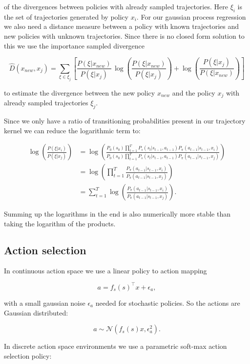 of the divergences between policies with already sampled trajectories. Here $\xi_i$ is the set of trajectories generated by policy $x_i$. For our gaussian process regression we also need a distance measure between a policy with known trajectories and new policies with unknown trajectories. Since there is no closed form solution to this we use the importance sampled divergence

$$\hat{D}(x_{ new }, x_{ j }) = \sum _{\xi \in \xi_j} \left[\frac{P(\xi|x_{ new })}{P(\xi|x_{ j })}\,\log\left(\frac{P(\xi|x_{new})}{P(\xi|x_{j})}\right)+\log\left(\frac{P(\xi|x_{ j })}{P(\xi|x_{ new })}\right)\right] $$

to estimate the divergence between the new policy $x_{new}$ and the policy $x_j$ with already sampled trajectories $\xi_j$.

Since we only have a ratio of transitioning probabilities present in our trajectory kernel we can reduce the logarithmic term to:

\begin{align*}
    \log\left(\frac{P(\xi|x_i)}{P(\xi|x_j)}\right)
    &= \log\left(\frac{P_{0}(s_{0}) \prod_{t=1}^{T} P_s(s_{t}|s_{t-1},a_{t-1}) P_{\pi}(a_{t-1}|s_{t-1},x_i)}{P_{0}(s_{0}) \prod_{t=1}^{T} P_s(s_{t}|s_{t-1},a_{t-1}) P_{\pi}(a_{t-1}|s_{t-1},x_j)}\right)\\
    &= \log\left(\prod_{t=1}^{T}\frac{ P_{\pi}(a_{t-1}|s_{t-1},x_i)}{P_{\pi}(a_{t-1}|s_{t-1},x_j)}\right)\\
    &= \sum_{t=1}^{T} \log \left(\frac{P_{\pi}(a_{t-1}|s_{t-1},x_i)}{P_{\pi}(a_{t-1}|s_{t-1},x_j)}\right).
\end{align*}


Summing up the logarithms in the end is also numerically more stable than taking the logarithm of the products.

\subsection{Action selection}

In continuous action space we use a linear policy to action mapping

$$a = f_s(s)^\top x + \epsilon_a,$$

with a small gaussian noise $\epsilon_a$ needed for stochastic policies. So the actions are Gaussian distributed:

$$a \sim \mathcal{N}(f_s(s) x,\epsilon_a^2).$$

In discrete action space environments we use a parametric soft-max action selection policy:

